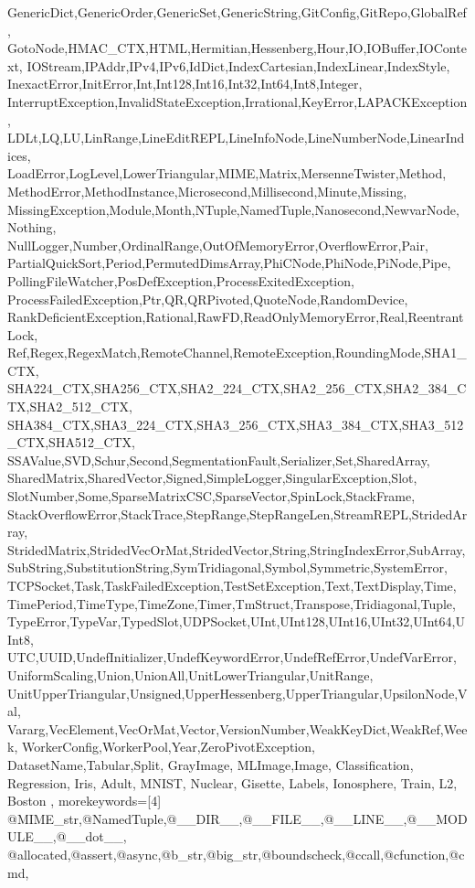 {{GenericDict,GenericOrder,GenericSet,GenericString,GitConfig,GitRepo,GlobalRef,%
GotoNode,HMAC_CTX,HTML,Hermitian,Hessenberg,Hour,IO,IOBuffer,IOContext,%
IOStream,IPAddr,IPv4,IPv6,IdDict,IndexCartesian,IndexLinear,IndexStyle,%
InexactError,InitError,Int,Int128,Int16,Int32,Int64,Int8,Integer,%
InterruptException,InvalidStateException,Irrational,KeyError,LAPACKException,%
LDLt,LQ,LU,LinRange,LineEditREPL,LineInfoNode,LineNumberNode,LinearIndices,%
LoadError,LogLevel,LowerTriangular,MIME,Matrix,MersenneTwister,Method,%
MethodError,MethodInstance,Microsecond,Millisecond,Minute,Missing,%
MissingException,Module,Month,NTuple,NamedTuple,Nanosecond,NewvarNode,Nothing,%
NullLogger,Number,OrdinalRange,OutOfMemoryError,OverflowError,Pair,%
PartialQuickSort,Period,PermutedDimsArray,PhiCNode,PhiNode,PiNode,Pipe,%
PollingFileWatcher,PosDefException,ProcessExitedException,%
ProcessFailedException,Ptr,QR,QRPivoted,QuoteNode,RandomDevice,%
RankDeficientException,Rational,RawFD,ReadOnlyMemoryError,Real,ReentrantLock,%
Ref,Regex,RegexMatch,RemoteChannel,RemoteException,RoundingMode,SHA1_CTX,%
SHA224_CTX,SHA256_CTX,SHA2_224_CTX,SHA2_256_CTX,SHA2_384_CTX,SHA2_512_CTX,%
SHA384_CTX,SHA3_224_CTX,SHA3_256_CTX,SHA3_384_CTX,SHA3_512_CTX,SHA512_CTX,%
SSAValue,SVD,Schur,Second,SegmentationFault,Serializer,Set,SharedArray,%
SharedMatrix,SharedVector,Signed,SimpleLogger,SingularException,Slot,%
SlotNumber,Some,SparseMatrixCSC,SparseVector,SpinLock,StackFrame,%
StackOverflowError,StackTrace,StepRange,StepRangeLen,StreamREPL,StridedArray,%
StridedMatrix,StridedVecOrMat,StridedVector,String,StringIndexError,SubArray,%
SubString,SubstitutionString,SymTridiagonal,Symbol,Symmetric,SystemError,%
TCPSocket,Task,TaskFailedException,TestSetException,Text,TextDisplay,Time,%
TimePeriod,TimeType,TimeZone,Timer,TmStruct,Transpose,Tridiagonal,Tuple,%
TypeError,TypeVar,TypedSlot,UDPSocket,UInt,UInt128,UInt16,UInt32,UInt64,UInt8,%
UTC,UUID,UndefInitializer,UndefKeywordError,UndefRefError,UndefVarError,%
UniformScaling,Union,UnionAll,UnitLowerTriangular,UnitRange,%
UnitUpperTriangular,Unsigned,UpperHessenberg,UpperTriangular,UpsilonNode,Val,%
Vararg,VecElement,VecOrMat,Vector,VersionNumber,WeakKeyDict,WeakRef,Week,%
WorkerConfig,WorkerPool,Year,ZeroPivotException,%
DatasetName,Tabular,Split, GrayImage, MLImage,Image, Classification, Regression,%
Iris, Adult, MNIST, Nuclear, Gisette, Labels, Ionosphere, Train, L2, Boston 
},%
%
%
morekeywords=[4]
{%
@MIME_str,@NamedTuple,@__DIR__,@__FILE__,@__LINE__,@__MODULE__,@__dot__,%
@allocated,@assert,@async,@b_str,@big_str,@boundscheck,@ccall,@cfunction,@cmd,%
}}
